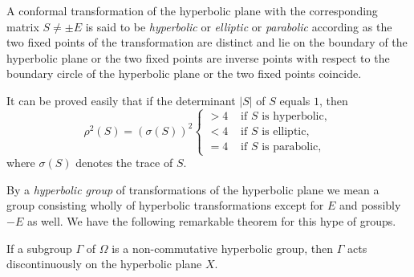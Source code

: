 \begin{defi*}
A conformal \pageoriginale transformation of the hyperbolic plane with
the corresponding matrix $S\neq \pm E$ is said to be
\textit{hyperbolic} or \textit{elliptic} or \textit{parabolic}
according as the two fixed points of the transformation are distinct
and lie on the boundary of the hyperbolic plane or the two fixed
points are inverse points with respect to the boundary circle of the
hyperbolic plane or the two fixed points coincide.
\end{defi*}

It can be proved easily that if the determinant $|S|$ of $S$ equals
$1$, then 
\begin{equation*}
\rho^2 (S) = (\sigma(S))^2 
\begin{cases}
> 4 & \text{ if $S$ is hyperbolic},\\
< 4 & \text{ if $S$ is elliptic},\\
= 4 & \text{ if $S$ is parabolic},
\end{cases} \tag{1}\label{eq2:1}
\end{equation*}
where $\sigma(S)$ denotes the trace of $S$.

By a \textit{hyperbolic group} of transformations of the hyperbolic
plane we mean a group consisting wholly of hyperbolic transformations
except for $E$ and possibly $-E$ as well. We have the following
remarkable theorem for this hype of groups.

\begin{thm}
If a subgroup $\Gamma$ of $\Omega$ is a non-commutative hyperbolic
group, then $\Gamma$ acts discontinuously on the hyperbolic plane $X$.
\end{thm}

